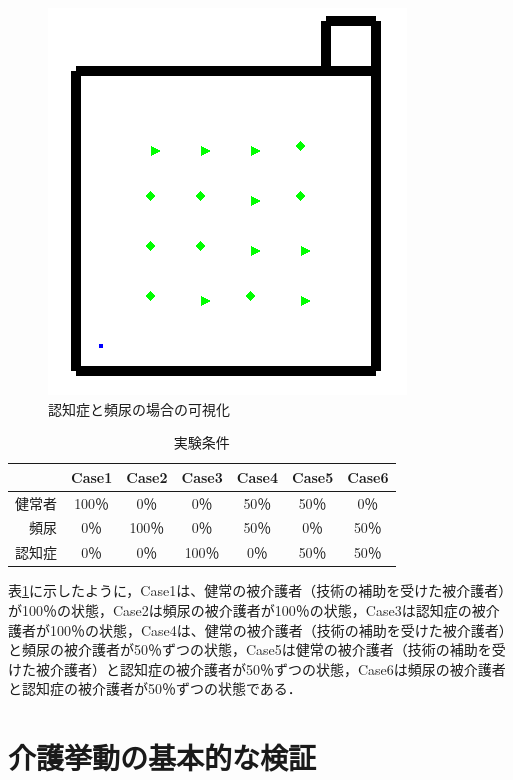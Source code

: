 \begin{figure}[htb]
\begin{center}
 \includegraphics[scale=0.5]{figures/dementia_urinate_v1.png}
 \caption[認知症と頻尿の場合の可視化]{認知症と頻尿の場合の可視化 \label{dementia_urinate_v1}}
\end{center}
\end{figure}

\begin{table}[htb]
  \caption[実験条件]{実験条件}
  \label{experiment}
  \centering
  \begin{tabular}{r|c|c|c|c|c|c}
     & Case1 & Case2 & Case3 & Case4 & Case5 & Case6 \\ \hline
    健常者 & 100％ & 0％ & 0％ & 50％ & 50％ & 0％ \\
    頻尿   & 0％ & 100％ & 0％ & 50％ & 0％ & 50％ \\
    認知症 & 0％ & 0％ & 100％ & 0％ & 50％ & 50％ \\
    \end{tabular}
\end{table}

表\ref{experiment}に示したように，Case1は、健常の被介護者（技術の補助を受けた被介護者）が100％の状態，Case2は頻尿の被介護者が100％の状態，Case3は認知症の被介護者が100％の状態，Case4は、健常の被介護者（技術の補助を受けた被介護者）と頻尿の被介護者が50％ずつの状態，Case5は健常の被介護者（技術の補助を受けた被介護者）と認知症の被介護者が50％ずつの状態，Case6は頻尿の被介護者と認知症の被介護者が50％ずつの状態である．

\section{介護挙動の基本的な検証}

